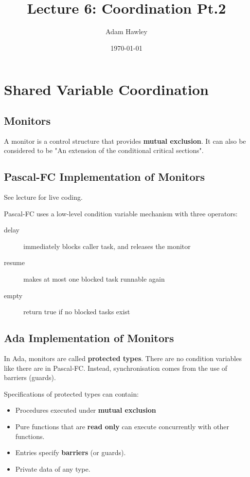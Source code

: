 \documentclass[11pt]{article}
\author{Adam Hawley}
\date{\today}
\title{Lecture 6: Coordination Pt.2}
\begin{document}
\maketitle
\tableofcontents


\section{Shared Variable Coordination}
\label{sec:org76b0c1a}
\subsection{Monitors}
\label{sec:orgc6b39f7}
A monitor is a control structure that provides \textbf{mutual exclusion}.
It can also be considered to be "An extension of the conditional critical sections".

\subsection{Pascal-FC Implementation of Monitors}
\label{sec:orgc133918}
See lecture for live coding.

Pascal-FC uses a low-level condition variable mechanism with three operators:
\begin{description}
\item[{delay}] immediately blocks caller task, and releases the monitor
\item[{resume}] makes at most one blocked task runnable again
\item[{empty}] return true if no blocked tasks exist
\end{description}

\subsection{Ada Implementation of Monitors}
\label{sec:orgae60d96}
In Ada, monitors are called \textbf{protected types}.
There are no condition variables like there are in Pascal-FC.
Instead, synchronisation comes from the use of barriers (guards).

Specifications of protected types can contain:
\begin{itemize}
\item Procedures executed under \textbf{mutual exclusion}
\item Pure functions that are \textbf{read only} can execute concurrently with other functions.
\item Entries specify \textbf{barriers} (or guards).
\item Private data of any type.
\end{itemize}
\end{document}
